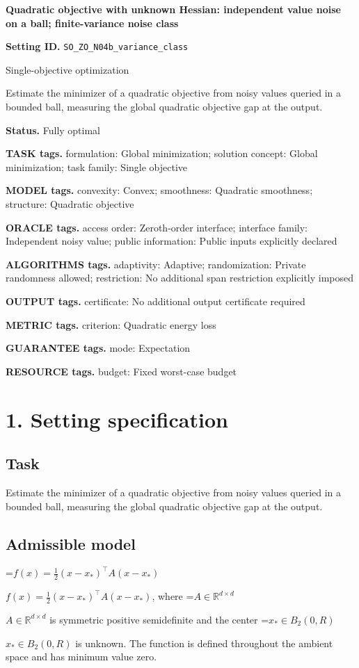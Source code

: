 \documentclass[10pt,a4paper]{article}
\newcommand{\AtlasMath}[1]{\par\begingroup\centering\setbox0=\hbox{$\displaystyle #1$}\ifdim\wd0>1.4\linewidth\typeout{ATLAS WIDE FORMULA: \the\wd0}\fi\ifdim\wd0>\linewidth\resizebox{\linewidth}{!}{\box0}\else\box0\fi\par\endgroup}
\newcommand{\AtlasInlineMath}[1]{\begingroup\setbox0=\hbox{$#1$}\ifdim\wd0>.4\linewidth\endgroup\AtlasMath{#1}\else\endgroup$#1$\fi}
\begin{document}
\raggedright

{\LARGE\bfseries\sffamily\color{AtlasNavy} Quadratic objective with unknown Hessian: independent value noise on a ball; finite-variance noise class\par}\vspace{5pt}
\textbf{Setting ID.} \texttt{SO\_\allowbreak{}ZO\_\allowbreak{}N04b\_\allowbreak{}variance\_\allowbreak{}class}

Single-objective optimization

Estimate the minimizer of a quadratic objective from noisy values queried in a bounded ball, measuring the global quadratic objective gap at the output.

\textbf{Status.} Fully optimal

\textbf{TASK tags.} formulation: Global minimization; solution concept: Global minimization; task family: Single objective

\textbf{MODEL tags.} convexity: Convex; smoothness: Quadratic smoothness; structure: Quadratic objective

\textbf{ORACLE tags.} access order: Zeroth-order interface; interface family: Independent noisy value; public information: Public inputs explicitly declared

\textbf{ALGORITHMS tags.} adaptivity: Adaptive; randomization: Private randomness allowed; restriction: No additional span restriction explicitly imposed

\textbf{OUTPUT tags.} certificate: No additional output certificate required

\textbf{METRIC tags.} criterion: Quadratic energy loss

\textbf{GUARANTEE tags.} mode: Expectation

\textbf{RESOURCE tags.} budget: Fixed worst-case budget

\section{1. Setting specification}
\subsection{Task}
Estimate the minimizer of a quadratic objective from noisy values queried in a bounded ball, measuring the global quadratic objective gap at the output.

\subsection{Admissible model}
\AtlasInlineMath{f(x)=\frac12(x-x_*)^\top A(x-x_*)}, where \AtlasInlineMath{A\in\mathbb{R}^{d\times d}} is symmetric positive semidefinite and the center \AtlasInlineMath{x_*\in B_2(0,R)} is unknown. The function is defined throughout the ambient space and has minimum value zero.
\end{document}
